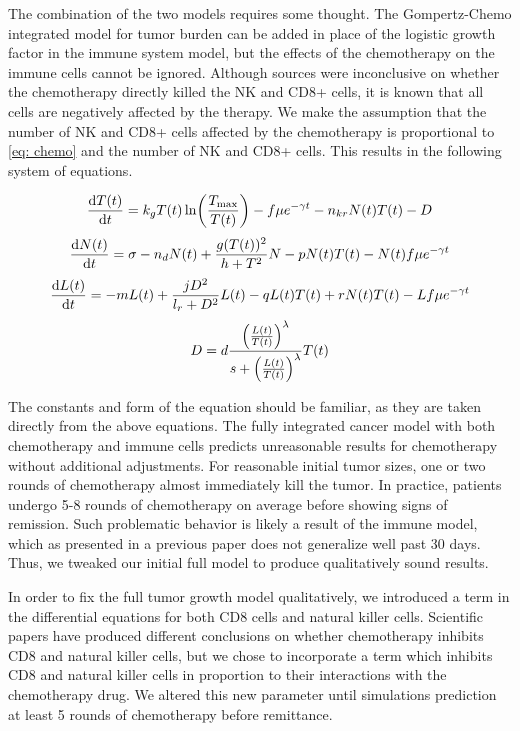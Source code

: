 \documentclass[11pt]{amsart}
\begin{document}
The combination of the two models requires some thought. The Gompertz-Chemo integrated model for tumor burden can be added in place of the logistic growth factor in the immune system model, but the effects of the chemotherapy on the immune cells cannot be ignored. Although sources were inconclusive on whether the chemotherapy directly killed the NK and CD8+ cells, it is known that all cells are negatively affected by the therapy. We make the assumption that the number of NK and CD8+ cells affected by the chemotherapy is proportional to \eqref{eq: chemo} and the number of NK and CD8+ cells. This results in the following system of equations.

\begin{equation} \label{eq:unifiedmodel}
\frac{\mathop{}\!\mathrm{d} T(t)}{\mathop{}\!\mathrm{d} t} = k_g T(t) \ln \biggl(\frac{T_{\max}}{T(t)} \biggr) - f \mu e^{-\gamma t} - n_{kr}N(t)T(t) - D 
\end{equation}
\begin{equation} \label{eq: NK}
\frac{\mathop{}\!\mathrm{d} N(t)}{\mathop{}\!\mathrm{d} t} = \sigma - n_dN(t) +\frac{g(T(t))^2}{h + T^2}N - pN(t)T(t) - N(t)f \mu e^{-\gamma t}
\end{equation}
\begin{equation} \label{eq:CD8}
\frac{\mathop{}\!\mathrm{d} L(t)}{\mathop{}\!\mathrm{d} t} = - mL(t) +\frac{jD^2}{l_r + D^2}L(t) - qL(t)T(t) + rN(t)T(t) - Lf \mu e^{-\gamma t}
\end{equation}
\begin{equation} \label{eq:Dconst}
D = d\frac{\Bigl(\frac{L(t)}{T(t)}\Bigr)^\lambda}{s + \Bigl(\frac{L(t)}{T(t)}\Bigr)^\lambda}T(t)
\end{equation}

The constants and form of the equation should be familiar, as they are taken directly from the above equations. 
The fully integrated cancer model with both chemotherapy and immune cells predicts unreasonable results for chemotherapy without additional adjustments. For reasonable initial tumor sizes, one or two rounds of chemotherapy almost immediately kill the tumor. In practice, patients undergo 5-8 rounds of chemotherapy on average before showing signs of remission. Such problematic behavior is likely a result of the immune model, which as presented in a previous paper does not generalize well past 30 days. Thus, we tweaked our initial full model to produce qualitatively sound results.

In order to fix the full tumor growth model qualitatively, we introduced a term in the differential equations for both CD8 cells and natural killer cells. Scientific papers have produced different conclusions on whether chemotherapy inhibits CD8 and natural killer cells, but we chose to incorporate a term which inhibits CD8 and natural killer cells in proportion to their interactions with the chemotherapy drug. We altered this new parameter until simulations prediction at least 5 rounds of chemotherapy before remittance. 
\end{document}

